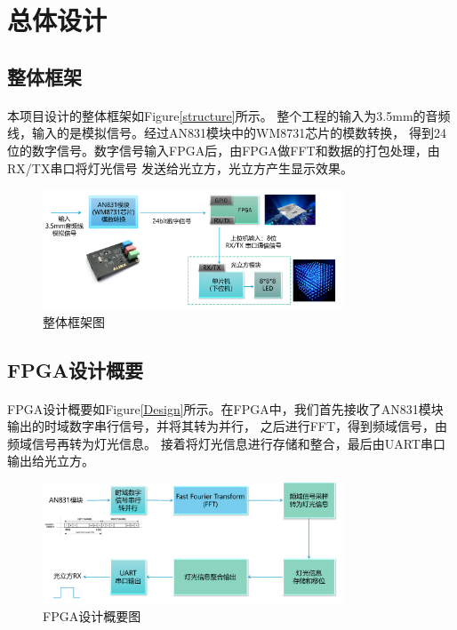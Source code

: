 \documentclass[12pt]{article}
\begin{document}
\section{总体设计}
\subsection{整体框架}
\paragraph{}本项目设计的整体框架如Figure\eqref{structure}所示。 
整个工程的输入为3.5mm的音频线，输入的是模拟信号。经过AN831模块中的WM8731芯片的模数转换，
得到24位的数字信号。数字信号输入FPGA后，由FPGA做FFT和数据的打包处理，由RX/TX串口将灯光信号
发送给光立方，光立方产生显示效果。


\begin{figure}[h]
    \centering
    \label{structure}
        \includegraphics[width=0.8\textwidth]{./pic/structure.png}
        \caption{整体框架图}
\end{figure}


\subsection{FPGA设计概要}
\paragraph{}
FPGA设计概要如Figure\eqref{Design}所示。在FPGA中，我们首先接收了AN831模块输出的时域数字串行信号，并将其转为并行，
之后进行FFT，得到频域信号，由频域信号再转为灯光信息。
接着将灯光信息进行存储和整合，最后由UART串口输出给光立方。

\begin{figure}[h]
    \centering
    \label{Design}
        \includegraphics[width=0.8\textwidth]{./pic/Design.png}
        \caption{FPGA设计概要图}
\end{figure}
\end{document}
